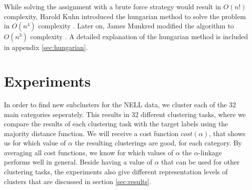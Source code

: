 
While solving the assignment with a brute force strategy would result in $O(n!)$ complexity, Harold Kuhn introduced the hungarian method to solve the problem in $O(n^4)$ complexity \cite{kuhn1955hungarian}. Later on, James Munkred modified the algorithm to $O(n^3)$ complexity \cite{munkres1957algorithms}. A detailed explanation of the hungarian method is included in appendix \ref{sec:hungarian}.

\section{Experiments}

In order to find new subclusters for the NELL data, we cluster each of the 32 main categories seperately. This results in 32 different clustering tasks, where we compare the results of each clustering task with the target labels using the majority distance function. We will receive a cost function $cost(\alpha)$, that shows us for which value of $\alpha$ the resulting clusterings are good, for each category. By averaging all cost functions, we know for which values of $\alpha$ the $\alpha$-linkage performs well in general. Beside having a value of $\alpha$ that can be used for other clustering tasks, the experiments also give different representation levels of clusters that are discussed in section \ref{sec:results}.

